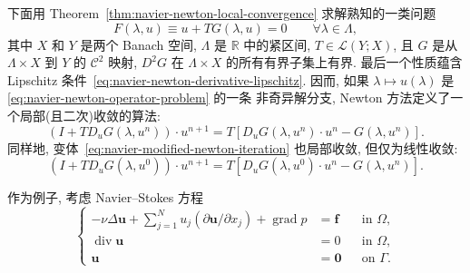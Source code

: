 下面用 Theorem~\ref{thm:navier-newton-local-convergence} 求解熟知的一类问题
\begin{equation}
\label{eq:navier-newton-operator-problem}
F(\lambda,u)\equiv u+TG(\lambda,u)=0
\qquad\forall\lambda\in\Lambda,
\end{equation}
其中 $X$ 和 $Y$ 是两个 Banach 空间, $\Lambda$ 是 $\mathbb R$ 中的紧区间,
$T\in\mathcal L(Y;X)$, 且 $G$ 是从 $\Lambda\times X$ 到 $Y$ 的 $\mathcal C^2$
映射, $D^2G$ 在 $\Lambda\times X$ 的所有有界子集上有界. 最后一个性质蕴含
Lipschitz 条件 \,\eqref{eq:navier-newton-derivative-lipschitz}. 因而, 如果
$\lambda\mapsto u(\lambda)$ 是 \,\eqref{eq:navier-newton-operator-problem} 的一条
非奇异解分支, Newton 方法定义了一个局部(且二次)收敛的算法:
\begin{equation}
\label{eq:navier-newton-operator-iteration}
(I+TD_uG(\lambda,u^n))\mathbin{\cdot}u^{n+1}
=T[D_uG(\lambda,u^n)\mathbin{\cdot}u^n-G(\lambda,u^n)].
\end{equation}
同样地, 变体 \,\eqref{eq:navier-modified-newton-iteration} 也局部收敛, 但仅为线性收敛:
\begin{equation}
\label{eq:navier-modified-newton-operator-iteration}
(I+TD_uG(\lambda,u^0))\mathbin{\cdot}u^{n+1}
=T[D_uG(\lambda,u^0)\mathbin{\cdot}u^n-G(\lambda,u^n)].
\end{equation}

作为例子, 考虑 Navier--Stokes 方程
\begin{equation}
\label{eq:navier-newton-navier-stokes-system}
\left\{
\begin{aligned}
-\nu\Delta\boldsymbol u+
\sum_{j=1}^Nu_j(\partial\boldsymbol u/\partial x_j)
+\operatorname{grad}p&=\boldsymbol f&&\text{in }\Omega,\\
\operatorname{div}\boldsymbol u&=0&&\text{in }\Omega,\\
\boldsymbol u&=\boldsymbol0&&\text{on }\Gamma.
\end{aligned}
\right.
\end{equation}


